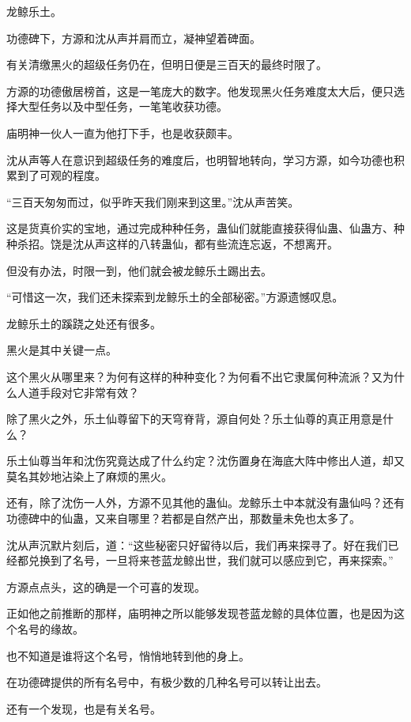 
\begin{this_body}

龙鲸乐土。

功德碑下，方源和沈从声并肩而立，凝神望着碑面。

有关清缴黑火的超级任务仍在，但明日便是三百天的最终时限了。

方源的功德傲居榜首，这是一笔庞大的数字。他发现黑火任务难度太大后，便只选择大型任务以及中型任务，一笔笔收获功德。

庙明神一伙人一直为他打下手，也是收获颇丰。

沈从声等人在意识到超级任务的难度后，也明智地转向，学习方源，如今功德也积累到了可观的程度。

“三百天匆匆而过，似乎昨天我们刚来到这里。”沈从声苦笑。

这是货真价实的宝地，通过完成种种任务，蛊仙们就能直接获得仙蛊、仙蛊方、种种杀招。饶是沈从声这样的八转蛊仙，都有些流连忘返，不想离开。

但没有办法，时限一到，他们就会被龙鲸乐土踢出去。

“可惜这一次，我们还未探索到龙鲸乐土的全部秘密。”方源遗憾叹息。

龙鲸乐土的蹊跷之处还有很多。

黑火是其中关键一点。

这个黑火从哪里来？为何有这样的种种变化？为何看不出它隶属何种流派？又为什么人道手段对它非常有效？

除了黑火之外，乐土仙尊留下的天穹脊背，源自何处？乐土仙尊的真正用意是什么？

乐土仙尊当年和沈伤究竟达成了什么约定？沈伤置身在海底大阵中修出人道，却又莫名其妙地沾染上了麻烦的黑火。

还有，除了沈伤一人外，方源不见其他的蛊仙。龙鲸乐土中本就没有蛊仙吗？还有功德碑中的仙蛊，又来自哪里？若都是自然产出，那数量未免也太多了。

沈从声沉默片刻后，道：“这些秘密只好留待以后，我们再来探寻了。好在我们已经都兑换到了名号，一旦将来苍蓝龙鲸出世，我们就可以感应到它，再来探索。”

方源点点头，这的确是一个可喜的发现。

正如他之前推断的那样，庙明神之所以能够发现苍蓝龙鲸的具体位置，也是因为这个名号的缘故。

也不知道是谁将这个名号，悄悄地转到他的身上。

在功德碑提供的所有名号中，有极少数的几种名号可以转让出去。

还有一个发现，也是有关名号。


\end{this_body}
